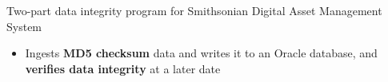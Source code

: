 \begin{cventries}
{\begin{cvitems}
	  \item {Two-part data integrity program for Smithsonian Digital Asset Management System}
        \begin{itemize}
			\item {Ingests \textbf{MD5 checksum} data and writes it to an Oracle database, and \textbf{verifies data integrity} at a later date}
        \end{itemize}
      \end{cvitems}
    }
	\vspace{-1.0em}
\end{cventries}
